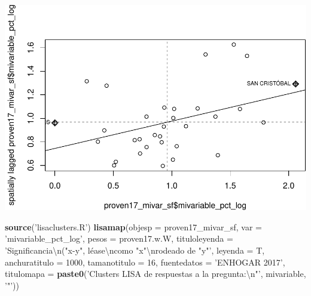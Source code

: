 \documentclass[11pt,]{article}
\newenvironment{Shaded}{\begin{snugshade}}{\end{snugshade}}
\newcommand{\KeywordTok}[1]{\textcolor[rgb]{0.13,0.29,0.53}{\textbf{#1}}}
\newcommand{\DataTypeTok}[1]{\textcolor[rgb]{0.13,0.29,0.53}{#1}}
\newcommand{\DecValTok}[1]{\textcolor[rgb]{0.00,0.00,0.81}{#1}}
\newcommand{\CharTok}[1]{\textcolor[rgb]{0.31,0.60,0.02}{#1}}
\newcommand{\StringTok}[1]{\textcolor[rgb]{0.31,0.60,0.02}{#1}}
\newcommand{\OperatorTok}[1]{\textcolor[rgb]{0.81,0.36,0.00}{\textbf{#1}}}
\newcommand{\NormalTok}[1]{#1}
\begin{document}
\begin{Shaded}
\end{Shaded}

\includegraphics{proyecto_files/figure-latex/unnamed-chunk-25-1.pdf}

\begin{Shaded}
\begin{Highlighting}[]
\KeywordTok{source}\NormalTok{(}\StringTok{'lisaclusters.R'}\NormalTok{)}
\KeywordTok{lisamap}\NormalTok{(}\DataTypeTok{objesp =}\NormalTok{ proven17_mivar_sf,}
        \DataTypeTok{var =} \StringTok{'mivariable_pct_log'}\NormalTok{,}
        \DataTypeTok{pesos =}\NormalTok{ proven17.w.W,}
        \DataTypeTok{tituloleyenda =} \StringTok{'Significancia}\CharTok{\textbackslash{}n}\StringTok{("x-y", léase}\CharTok{\textbackslash{}n}\StringTok{como "x"}\CharTok{\textbackslash{}n}\StringTok{rodeado de "y"'}\NormalTok{,}
        \DataTypeTok{leyenda =}\NormalTok{ T,}
        \DataTypeTok{anchuratitulo =} \DecValTok{1000}\NormalTok{,}
        \DataTypeTok{tamanotitulo =} \DecValTok{16}\NormalTok{,}
        \DataTypeTok{fuentedatos =} \StringTok{'ENHOGAR 2017'}\NormalTok{,}
        \DataTypeTok{titulomapa =} \KeywordTok{paste0}\NormalTok{(}\StringTok{'Clusters LISA de respuestas a la pregunta:}\CharTok{\textbackslash{}n}\StringTok{"'}\NormalTok{, mivariable, }\StringTok{'"'}\NormalTok{))}
\end{Highlighting}
\end{Shaded}
\end{document}

